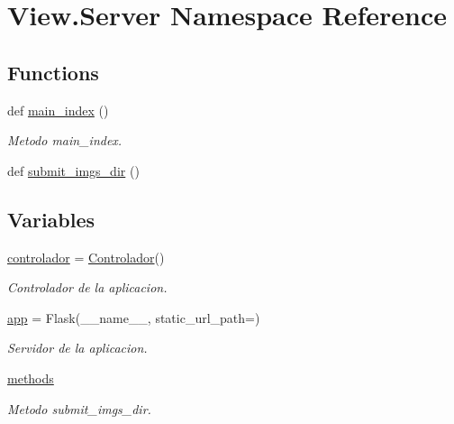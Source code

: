 \hypertarget{namespace_view_1_1_server}{}\section{View.\+Server Namespace Reference}
\label{namespace_view_1_1_server}
\subsection*{Functions}
\begin{DoxyCompactItemize}
\item 
def \hyperlink{namespace_view_1_1_server_a5930cd00b260fa08974ca5c2d01b3ea9}{main\+\_\+index} ()
\begin{DoxyCompactList}\small\item\em Metodo main\+\_\+index. \end{DoxyCompactList}\item 
def \hyperlink{namespace_view_1_1_server_a4052e38601441162da5a6650e331ce08}{submit\+\_\+imgs\+\_\+dir} ()
\end{DoxyCompactItemize}
\subsection*{Variables}
\begin{DoxyCompactItemize}
\item 
\hyperlink{namespace_view_1_1_server_a43f59f058a13ad9dd780b87e79bff183}{controlador} = \hyperlink{class_controller_1_1_controlador_1_1_controlador}{Controlador}()
\begin{DoxyCompactList}\small\item\em Controlador de la aplicacion. \end{DoxyCompactList}\item 
\hyperlink{namespace_view_1_1_server_a5fc9583cfd3f8ee6cbfa5eee1675bf9f}{app} = Flask(\+\_\+\+\_\+name\+\_\+\+\_\+, static\+\_\+url\+\_\+path=\textquotesingle{}\textquotesingle{})
\begin{DoxyCompactList}\small\item\em Servidor de la aplicacion. \end{DoxyCompactList}\item 
\hyperlink{namespace_view_1_1_server_a2ab6609038f4f128d63e92a4e73d5f09}{methods}
\begin{DoxyCompactList}\small\item\em Metodo submit\+\_\+imgs\+\_\+dir. \end{DoxyCompactList}\end{DoxyCompactItemize}


